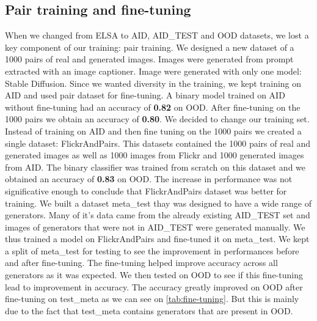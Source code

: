 \documentclass[12pt,a4paper]{article}
\begin{document}
\subsection{Pair training and fine-tuning}
When we changed from ELSA to AID, AID\_TEST and OOD datasets, we lost a key component of our training: pair training. We designed a new dataset of a 1000 pairs of real and generated images. Images were generated from prompt extracted with an image captioner. Image were generated with only one model: Stable Diffusion. Since we wanted diversity in the training, we kept training on AID and used pair dataset for fine-tuning. A binary model trained on AID without fine-tuning had an accuracy of \textbf{0.82} on OOD. After fine-tuning on the 1000 pairs we obtain an accuracy of \textbf{0.80}. We decided to change our training set. Instead of training on AID and then fine tuning on the 1000 pairs we created a single dataset: FlickrAndPairs. This datasets contained the 1000 pairs of real and generated images as well as 1000 images from Flickr and 1000 generated images from AID. The binary classifier was trained from scratch on this dataset and we obtained an accuracy of \textbf{0.83} on OOD. The increase in performance was not significative enough to conclude that FlickrAndPairs dataset was better for training. We built a dataset meta\_test thay was designed to have a wide range of generators. Many of it's data came from the already existing AID\_TEST set and images of generators that were not in AID\_TEST were generated manually. We thus trained a model on FlickrAndPairs and fine-tuned it on meta\_test. We kept a split of meta\_test for testing to see the improvement in performances before and after fine-tuning. The fine-tuning helped improve accuracy across all generators as it was expected. We then tested on OOD to see if this fine-tuning lead to improvement in accuracy. The accuracy greatly improved on OOD after fine-tuning on test\_meta as we can see on \autoref{tab:fine-tuning}. But this is mainly due to the fact that test\_meta contains generators that are present in OOD.
\end{document}
